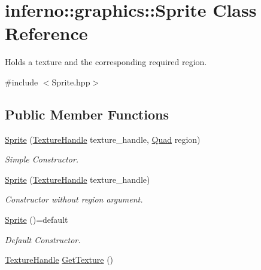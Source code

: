 \hypertarget{classinferno_1_1graphics_1_1_sprite}{}\section{inferno\+:\+:graphics\+:\+:Sprite Class Reference}
\label{classinferno_1_1graphics_1_1_sprite}


Holds a texture and the corresponding required region.  




{\ttfamily \#include $<$Sprite.\+hpp$>$}

\subsection*{Public Member Functions}
\begin{DoxyCompactItemize}
\item 
\mbox{\hyperlink{classinferno_1_1graphics_1_1_sprite_a404b45a087a04018e5e2bc5c7b59ab67}{Sprite}} (\mbox{\hyperlink{namespaceinferno_1_1graphics_a9d719bfbfedd17b9ace9b8d603ab5a38}{Texture\+Handle}} texture\+\_\+handle, \mbox{\hyperlink{classinferno_1_1graphics_1_1_quad}{Quad}} region)
\begin{DoxyCompactList}\small\item\em Simple Constructor. \end{DoxyCompactList}\item 
\mbox{\hyperlink{classinferno_1_1graphics_1_1_sprite_a8673ad1ca45d867e83355a1ad10b752a}{Sprite}} (\mbox{\hyperlink{namespaceinferno_1_1graphics_a9d719bfbfedd17b9ace9b8d603ab5a38}{Texture\+Handle}} texture\+\_\+handle)
\begin{DoxyCompactList}\small\item\em Constructor without region argument. \end{DoxyCompactList}\item 
\mbox{\label{classinferno_1_1graphics_1_1_sprite_a32f2beb808b266795f985315762e0446}} 
\mbox{\hyperlink{classinferno_1_1graphics_1_1_sprite_a32f2beb808b266795f985315762e0446}{Sprite}} ()=default
\begin{DoxyCompactList}\small\item\em Default Constructor. \end{DoxyCompactList}\item 
\mbox{\hyperlink{namespaceinferno_1_1graphics_a9d719bfbfedd17b9ace9b8d603ab5a38}{Texture\+Handle}} \mbox{\hyperlink{classinferno_1_1graphics_1_1_sprite_a289d0e72752f3606116c75442a710e61}{Get\+Texture}} ()

\end{DoxyCompactItemize}
